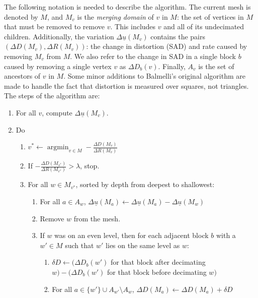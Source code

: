 \documentclass[11pt,letterpaper]{article}
\DeclareMathOperator*{\argmin}{argmin}
\begin{document}
The following notation is needed to describe the algorithm.
The current mesh is denoted by $M$, and $M_v$ is the \textit{merging domain} of
 $v$ in $M$: the set of vertices in $M$ that must be removed to remove $v$.
This includes $v$ and all of its undecimated children.
Additionally, the variation $\Delta\underline{u}(M_v)$ contains the pairs
 $(\Delta D(M_v),\Delta R(M_v))$: the change in distortion (SAD) and rate
 caused by removing $M_v$ from $M$.
We also refer to the change in SAD in a single block $b$ caused by removing a
 single vertex $v$ as $\Delta D_b(v)$.
Finally, $A_v$ is the set of ancestors of $v$ in $M$.
Some minor additions to Balmelli's original algorithm are made to handle the
 fact that distortion is measured over squares, not triangles.
The steps of the algorithm are:
\begin{enumerate}
\item For all $v$, compute $\Delta\underline{u}(M_v)$.
\item Do
\begin{enumerate}
\item $v^*\leftarrow\argmin_{v\in M} -\frac{\Delta D(M_v)}{\Delta R(M_v)}$
\item If $-\frac{\Delta D(M_{v^*})}{\Delta R(M_{v^*})}>\lambda$, stop.
\item For all $w\in M_{v^*}$, sorted by depth from deepest to shallowest:
\begin{enumerate}
\item For all $a\in A_w$, $\Delta\underline{u}(M_a)\leftarrow
 \Delta\underline{u}(M_a)-\Delta\underline{u}(M_w)$
\item Remove $w$ from the mesh.
\item\label{step:deltad}
If $w$ was on an even level, then for each adjacent block $b$ with a $w'\in M$
 such that $w'$ lies on the same level as $w$:
\begin{enumerate}
\item $\delta D\leftarrow (\Delta D_b(w')$ for that block after decimating
 $w)-(\Delta D_b(w')$ for that block before decimating $w)$
\item\label{step:deltadupdate} For all $a\in \{w'\}\cup A_{w'}\setminus A_{w}$,
 $\Delta D(M_a)\leftarrow\Delta D(M_a)+\delta D$
\end{enumerate}
\end{enumerate}
\end{enumerate}
\end{enumerate}
\end{document}
